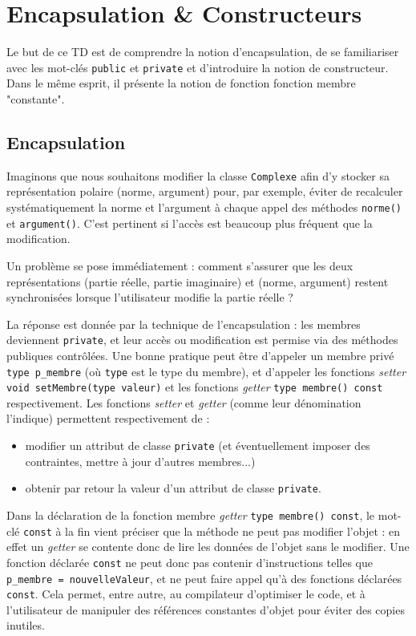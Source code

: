 \documentclass{book}
\newcommand{\inline}[1]{\texttt{#1}}
\begin{document}
\setcounter{chapter}{2}

\chapter{Encapsulation \& Constructeurs}

Le but de ce TD est de comprendre la notion d'encapsulation, de se familiariser avec les mot-clés \inline{public} et \inline{private} et d'introduire la notion de constructeur. Dans le même esprit, il présente la notion de fonction fonction membre "constante".

\section{Encapsulation}

Imaginons que nous souhaitons modifier la classe \inline{Complexe} afin d'y stocker sa représentation polaire (norme, argument) pour, par exemple, éviter de recalculer systématiquement la norme et l'argument à chaque appel des méthodes \inline{norme()} et \inline{argument()}. C'est pertinent si l'accès est beaucoup plus fréquent que la modification.

Un problème se pose immédiatement : comment s'assurer que les deux représentations (partie réelle, partie imaginaire) et (norme, argument) restent synchronisées lorsque l'utilisateur modifie la partie réelle ?

La réponse est donnée par la technique de l'encapsulation : les membres deviennent \inline{private}, et leur accès ou modification est permise via des méthodes publiques contrôlées. Une bonne pratique peut être d'appeler un membre privé \inline{type p_membre} (où \inline{type} est le type du membre), et d'appeler les fonctions \textit{setter} \inline{void setMembre(type valeur)} et les fonctions \textit{getter} \inline{type membre() const} respectivement. Les fonctions \textit{setter} et \textit{getter} (comme leur dénomination l'indique) permettent respectivement de :
\begin{itemize}
\item modifier un attribut de classe \inline{private} (et éventuellement imposer des contraintes, mettre à jour d'autres membres...)
\item obtenir par retour la valeur d'un attribut de classe \inline{private}.
\end{itemize}

Dans la déclaration de la fonction membre \textit{getter} \inline{type membre() const}, le mot-clé \inline{const} à la fin vient préciser que la méthode ne peut pas modifier l'objet : en effet un \textit{getter} se contente donc de lire les données de l'objet sans le modifier. Une fonction déclarée \inline{const} ne peut donc pas contenir d'instructions telles que \inline{p_membre = nouvelleValeur}, et ne peut faire appel qu'à des fonctions déclarées \inline{const}. Cela permet, entre autre, au compilateur d'optimiser le code, et à l'utilisateur de manipuler des références constantes d'objet pour éviter des copies inutiles.
\end{document}
